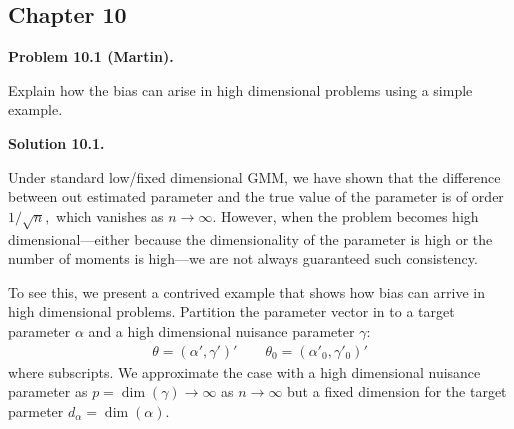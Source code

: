 \documentclass[11pt]{article}
\newenvironment{problem}[1]
    {\bigskip\noindent\textbf{Problem #1.}\par\setlength{\parindent}{0pt}}
    {\medskip}
\newenvironment{solution}[1]
    {\bigskip\noindent\textbf{Solution #1.} \par}
    {\medskip}
\begin{document}
\newpage

\subsection*{Chapter 10}


\begin{problem}{10.1 (Martin)}
Explain how the bias can arise in high dimensional problems using a simple example.
\end{problem}

\begin{solution}{10.1}
Under standard low/fixed dimensional GMM, we have shown that the difference between out estimated parameter and the true value of the parameter is of order $1/\sqrt{n},$ which vanishes as $n \to \infty.$ However, when the problem becomes high dimensional---either because the dimensionality of the parameter is high or the number of moments is high---we are not always guaranteed such consistency.

To see this, we present a contrived example that shows how bias can arrive in high dimensional problems. Partition the parameter vector in to a target parameter $\alpha$ and a high dimensional nuisance parameter $\gamma$:
\begin{align*}
    \theta = (\alpha', \gamma')' \qquad \theta_0 = (\alpha'_0, \gamma'_0)'
\end{align*}
where subscripts. We approximate the case with a high dimensional nuisance parameter as $p = \dim(\gamma) \to \infty $ as $n\to \infty$ but a fixed dimension for the target parmeter $d_\alpha = \dim(\alpha).$


\end{solution}
\end{document}
